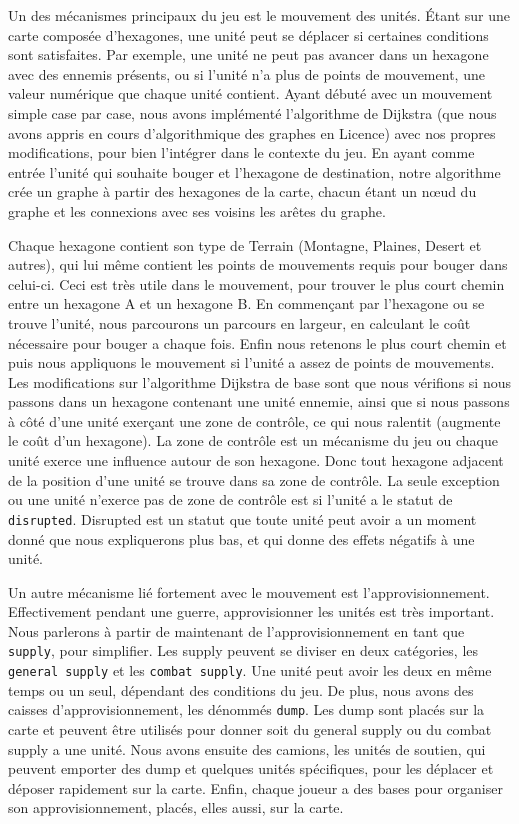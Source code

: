 Un des mécanismes principaux du jeu est le mouvement des unités.
Étant sur une carte composée d'hexagones, une unité peut se déplacer si certaines conditions sont satisfaites.
Par exemple, une unité ne peut pas avancer dans un hexagone avec des ennemis présents, ou si l'unité n'a plus de
points de mouvement, une valeur numérique que chaque unité contient. Ayant débuté avec un mouvement simple case
par case, nous avons implémenté l'algorithme de Dijkstra (que nous avons appris en cours d'algorithmique des graphes en Licence) 
avec nos propres modifications, pour bien l'intégrer dans
le contexte du jeu. En ayant comme entrée l'unité qui souhaite bouger et l'hexagone de destination, notre algorithme
crée un graphe à partir des hexagones de la carte, chacun étant un nœud du graphe et les connexions avec ses voisins
les arêtes du graphe.

Chaque hexagone contient son type de Terrain (Montagne, Plaines, Desert et autres), qui lui même contient les points
de mouvements requis pour bouger dans celui-ci. Ceci est très utile dans le mouvement, pour trouver le plus court
chemin entre un hexagone A et un hexagone B. En commençant par l'hexagone ou se trouve l'unité, nous parcourons un
parcours en largeur, en calculant le coût nécessaire pour bouger a chaque fois. Enfin nous retenons le plus court
chemin et puis nous appliquons le mouvement si l'unité a assez de points de mouvements. Les modifications sur
l'algorithme Dijkstra de base sont que nous vérifions si nous passons dans un hexagone contenant une unité ennemie,
ainsi que si nous passons à côté d'une unité exerçant une zone de contrôle, ce qui nous ralentit (augmente le coût
d'un hexagone). La zone de contrôle est un mécanisme du jeu ou chaque unité exerce une influence autour de son
hexagone. Donc tout hexagone adjacent de la position d'une unité se trouve dans sa zone de contrôle.
La seule exception ou une unité n'exerce pas de zone de contrôle est si l'unité a le statut de {\tt disrupted}.
Disrupted est un statut que toute unité peut avoir a un moment donné que nous expliquerons plus bas, et qui donne
des effets négatifs à une unité.

Un autre mécanisme lié fortement avec le mouvement est l'approvisionnement. Effectivement pendant une guerre,
approvisionner les unités est très important. Nous parlerons à partir de maintenant de l'approvisionnement en
tant que {\tt supply}, pour simplifier. Les supply peuvent se diviser en deux catégories, les {\tt general supply} et les
{\tt combat supply}. Une unité peut avoir les deux en même temps ou un seul, dépendant des conditions du jeu. De plus,
nous avons des caisses d'approvisionnement, les dénommés {\tt dump}. Les dump sont placés sur la carte et peuvent
être utilisés pour donner soit du general supply ou du combat supply a une unité. Nous avons ensuite des camions,
les unités de soutien, qui peuvent emporter des dump et quelques unités spécifiques, pour les déplacer et déposer
rapidement sur la carte. Enfin, chaque joueur a des bases pour organiser son approvisionnement, placés, elles aussi,
sur la carte.

